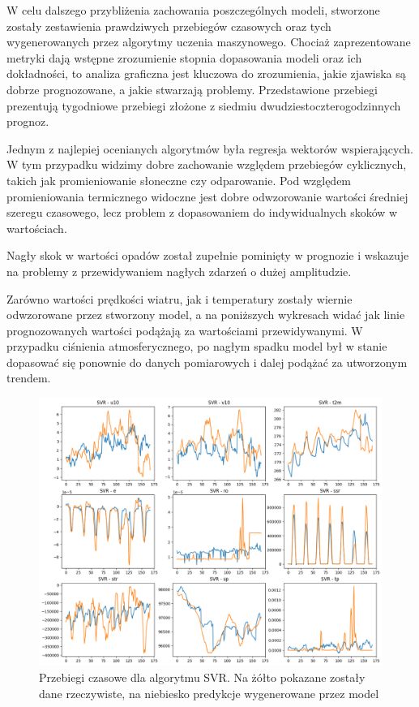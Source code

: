 W celu dalszego przybliżenia zachowania poszczególnych modeli, stworzone zostały
zestawienia prawdziwych przebiegów czasowych oraz tych wygenerowanych przez algorytmy
uczenia maszynowego. Chociaż zaprezentowane metryki dają wstępne zrozumienie
stopnia dopasowania modeli oraz ich dokładności, to analiza graficzna jest kluczowa
do zrozumienia, jakie zjawiska są dobrze prognozowane, a jakie stwarzają problemy.
Przedstawione przebiegi prezentują tygodniowe przebiegi złożone z siedmiu 
dwudziestoczterogodzinnych prognoz.

\pagebreak

Jednym z najlepiej ocenianych algorytmów była regresja wektorów wspierających.
W tym przypadku widzimy dobre zachowanie względem przebiegów cyklicznych, takich jak
promieniowanie słoneczne czy odparowanie. Pod względem promieniowania termicznego
widoczne jest dobre odwzorowanie wartości średniej szeregu czasowego, lecz problem
z dopasowaniem do indywidualnych skoków w wartościach.

Nagły skok w wartości opadów został zupełnie pominięty w prognozie i wskazuje 
na problemy z przewidywaniem nagłych zdarzeń o dużej amplitudzie. 

Zarówno wartości prędkości wiatru, jak i temperatury zostały wiernie odwzorowane
przez stworzony model, a na poniższych wykresach widać jak linie prognozowanych wartości
podążają za wartościami przewidywanymi. W przypadku ciśnienia atmosferycznego,
po nagłym spadku model był w stanie dopasować się ponownie do danych pomiarowych
i dalej podążać za utworzonym trendem.

\begin{figure}[H]
    \centering
    \includegraphics[width=\textwidth]{images/SVR_week.png}
    \caption{Przebiegi czasowe dla algorytmu SVR. Na żółto pokazane zostały dane 
    rzeczywiste, na niebiesko predykcje wygenerowane przez model}
    \label{svr-week}
\end{figure}

